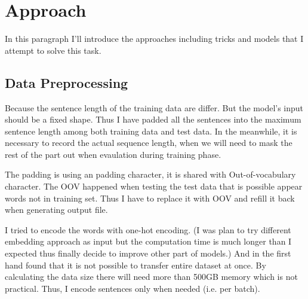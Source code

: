 \section{Approach}
\label{sec:approach}

In this paragraph I'll introduce the approaches including tricks and models that I attempt to solve this task.

\subsection*{Data Preprocessing}

Because the sentence length of the training data are differ. But the model's input should be a fixed shape. Thus I have padded all the sentences into the maximum sentence length among both training data and test data. In the meanwhile, it is necessary to record the actual sequence length, when we will need to mask the rest of the part out when evaulation during training phase.

The padding is using an padding character, it is shared with Out-of-vocabulary character. The OOV happened when testing the test data that is possible appear words not in training set. Thus I have to replace it with OOV and refill it back when generating output file.

I tried to encode the words with one-hot encoding. (I was plan to try different embedding approach as input but the computation time is much longer than I expected thus finally decide to improve other part of models.) And in the first hand found that it is not possible to transfer entire dataset at once. By calculating the data size there will need more than 500GB memory which is not practical. Thus, I encode sentences only when needed (i.e. per batch).



